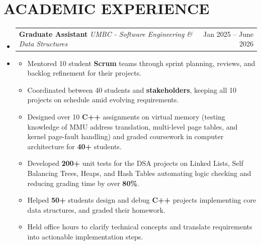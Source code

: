 \documentclass[letterpaper,11pt]{article}
\makeatletter
\newcommand{\SectionListBegin}{\begin{itemize}[leftmargin=0.15in, label={}]}
\newcommand{\SectionListEnd}{\end{itemize}}
\newcommand{\BulletItems}[1]{
  \item
    \begin{itemize}[label={-}, leftmargin=*, labelsep=0.3em, topsep=0pt, partopsep=0pt, itemsep=0pt, parsep=0pt]
      \small #1
    \end{itemize}\vspace{-5pt}
}
\newcommand{\SLSubheadingItemThF}[3]{
  \vspace{-2pt}\item
    \begin{tabular*}{0.97\textwidth}[t]{l@{\extracolsep{\fill}}r}
      \textbf{#1} \textbar{} \textit{\small #2} & {\small #3} \\
    \end{tabular*}\vspace{-7pt}
}
\newcommand{\SLSubheadingItemLink}[4]{
  \vspace{-2pt}\item
    \begin{tabular*}{0.97\textwidth}[t]{l@{\extracolsep{\fill}}r}
      \textbf{\href{#2}{#1}} \textbar{} \textit{\small #3} & {\small #4} \\
    \end{tabular*}\vspace{-7pt}
}
\makeatother
\begin{document}
\section{ACADEMIC EXPERIENCE}
  \SectionListBegin

    \SLSubheadingItemThF
      {Graduate Assistant}
      {UMBC - Software Engineering \& Data Structures}
      {Jan 2025 -- June 2026}
    \BulletItems{
      \item Mentored 10 student \textbf{Scrum} teams through sprint planning, reviews, and backlog refinement for their projects.
      \item Coordinated between 40 students and \textbf{stakeholders}, keeping all 10 projects on schedule amid evolving requirements.
      \item Designed over 10 \textbf{C++} assignments on virtual memory (testing knowledge of MMU address translation, multi-level page tables, and kernel page-fault handling) and graded coursework in computer architecture for \textbf{40+} students.
      \item Developed \textbf{200+} unit tests for the DSA projects on Linked Lists, Self Balancing Trees, Heaps, and Hash Tables automating logic checking and reducing grading time by over \textbf{80\%}.
      \item Helped \textbf{50+} students design and debug \textbf{C++} projects implementing core data structures, and graded their homework.
      \item Held office hours to clarify technical concepts and translate requirements into actionable implementation steps.
      }
    
  \SectionListEnd

\end{document}
